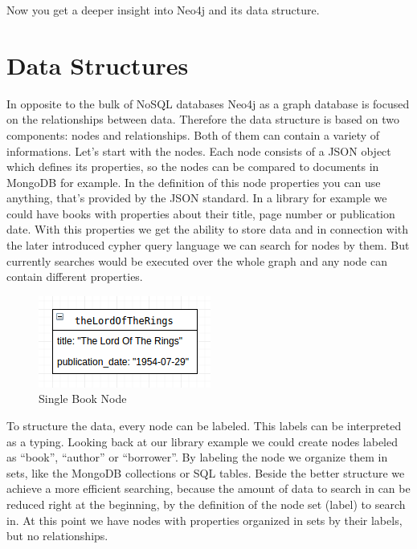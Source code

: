 Now you get a deeper insight into Neo4j and its data structure.

\section{Data Structures}

In opposite to the bulk of NoSQL databases Neo4j as a graph database is focused on the relationships between data.
Therefore the data structure is based on two components: nodes and relationships. Both of them can contain a variety of informations.
Let's start with the nodes. Each node consists of a JSON object which defines its properties, so the nodes can be compared to documents in MongoDB for example. In the definition of this node properties you can use anything, that's provided by the JSON standard. In a library for example we could have books with properties about their title, page number or publication date.
With this properties we get the ability to store data and in connection with the later introduced cypher query language we can search for nodes by them. But currently searches would be executed over the whole graph and any node can contain different properties.
\cite["Nodes", para. 3]{NeoTechnologyInc.2017c} \cite[p. 80]{Gupta.2015} \cite[slide 20-21]{Hunger.2013}

\begin{figure}[H]
	\begin{center}
		\includegraphics[keepaspectratio]{images/neo4j/data-structure/single-node.png}
		\caption{Single Book Node}
	\end{center}
\end{figure}

To structure the data, every node can be labeled. This labels can be interpreted as  a typing. Looking back at our library example we could create nodes labeled as “book”, “author” or “borrower”. By labeling the node we organize them in sets, like the MongoDB collections or SQL tables.
Beside the better structure we achieve a more efficient searching, because the amount of data to search in can be reduced right at the beginning, by the definition of the node set (label) to search in.
At this point we have nodes with properties organized in sets by their labels, but no relationships.
\cite["Labels", para. 2]{NeoTechnologyInc.2017c} \cite[slide 26-27]{Hunger.2013}

